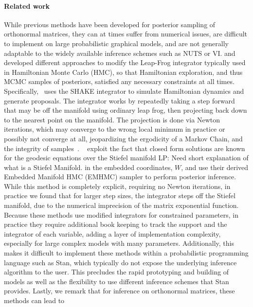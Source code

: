 \documentclass{article}
\newcommand{\commentLP}[1]{{\textcolor{commentLP_color}{LP: #1}}}
\begin{document}


\paragraph{Related work} While previous methods have been developed for posterior sampling of orthonormal matrices, they can at times suffer from numerical issues, are difficult to implement on large probabilistic graphical models, and are not generally adaptable to the widely available inference schemes such as NUTS or VI. \citet{brubaker2012family} and \citet{byrne2013geodesic} developed different approaches to modify the Leap-Frog integrator typically used in Hamiltonian Monte Carlo (HMC), so that Hamiltonian exploration, and thus MCMC samples of posteriors, satisfied any necessary constraints at all times. Specifically,~\citet{brubaker2012family} uses the SHAKE integrator \citep{leimkuhler2004simulating} to simulate Hamiltonian dynamics and generate proposals. The integrator works by repeatedly taking a step forward that may be off the manifold using ordinary leap frog, then projecting back down to the nearest point on the manifold. The projection is done via Newton iterations, which may converge to the wrong local minimum in practice or possibly not converge at all, jeopardizing the ergodicity of a Markov Chain, and the integrity of samples~\citep{betancourt2017divergences}. \citet{byrne2013geodesic}~ exploit the fact that closed form solutions are known for the geodesic equations over the Stiefel manifold \commentLP{Need short explanation of what is a Stiefel Manifold.} in the embedded coordinates, $W$, and use their derived Embedded Manifold HMC (EMHMC) sampler to perform posterior inference. While this method is completely explicit, requiring no Newton iterations, in practice we found that for larger step sizes, the integrator steps off the Stiefel manifold, due to the numerical imprecision of the matrix exponential function. Because these methods use modified integrators for constrained parameters, in practice they require additional book keeping to track the support and the integrator of each variable, adding a layer of implementation complexity, especially for large complex models with many parameters.  Additionally, this makes it difficult to implement these methods within a probabilistic programming language such as Stan, which typically do not expose the underlying inference algorithm to the user. This precludes the rapid prototyping and building of models as well as the flexibility to use different inference schemes that Stan provides. Lastly, we remark that for inference on orthonormal matrices, these methods can lead to 
\end{document}
